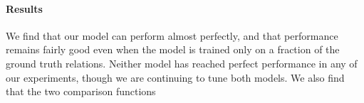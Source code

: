 \paragraph{Results} 
We find that our model can perform almost perfectly, and that performance remains fairly good even when the model 
is trained only on a fraction of the ground truth relations. Neither model has reached perfect performance in any
of our experiments, though we are continuing to tune both models. We also find that the two comparison functions

\begin{table}[h]
\centering{}
 \caption{Test (train) accuracy figures on the WordNet data. The baseline figure is simply the frequency of the most frequent class, .\label{b-table}}  
\end{table}

